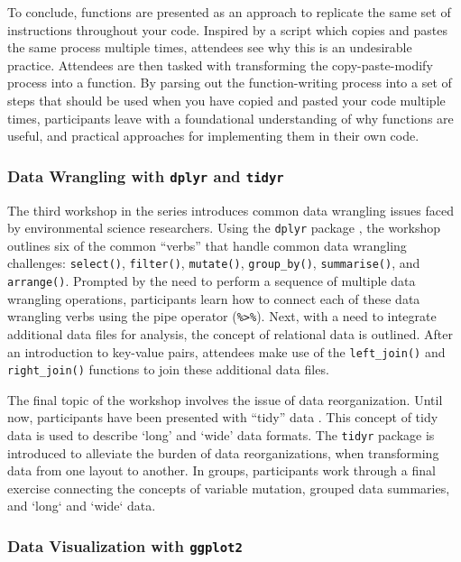 \documentclass[12pt]{article}
\begin{document}
\quad To conclude, functions are presented as an approach to replicate the same
set of instructions throughout your code. Inspired by a script
which copies and pastes the same process multiple times, attendees see
why this is an undesirable practice. Attendees are then tasked with transforming
the copy-paste-modify process into a function. By parsing out the function-writing
process into a set of steps that should be used when you have copied and
pasted your code multiple times, participants leave with a foundational
understanding of why functions are useful, and practical approaches for
implementing them in their own code.

\subsubsection{Data Wrangling with \texttt{dplyr} and \texttt{tidyr}}
\label{sec:wrangle}

\noindent The third workshop in the series introduces common data wrangling
issues faced by environmental science researchers. Using the \texttt{dplyr} 
package \citep{dplyr}, the workshop outlines six of the common ``verbs'' that
handle common data wrangling challenges: \texttt{select()}, \texttt{filter()},
\texttt{mutate()}, \texttt{group\_by()}, \texttt{summarise()}, and
\texttt{arrange()}. Prompted by the need to perform a sequence of multiple data
wrangling operations, participants learn how to connect each of these
data wrangling verbs using the pipe operator (\texttt{\%>\%}). Next, with a 
need to integrate additional data files for analysis, the concept of relational
data is outlined. After an introduction to key-value pairs, attendees
make use of the \texttt{left\_join()} and \texttt{right\_join()} functions to
join these additional data files. 

\quad The final topic of the workshop involves the issue of data reorganization.
Until now, participants have been presented with ``tidy'' data \citep{tidy}. 
This concept of tidy data is used to describe `long' and `wide' data
formats. The \texttt{tidyr} package \citep{tidyr} is introduced to alleviate the
burden of data reorganizations, when transforming data from one layout to
another. In groups, participants work through a final exercise connecting the
concepts of variable mutation, grouped data summaries, and `long` and `wide` 
data. 

\subsubsection{Data Visualization with \texttt{ggplot2}}
\label{sec:vizual} 
\end{document}
